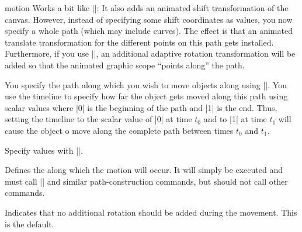\begin{sysanimateattribute}{motion}
    Works a bit like |\pgfsysanimvaltranslate|: It also adds an animated shift
    transformation of the canvas. However, instead of specifying some shift
    coordinates as values, you now specify a whole path (which may include
    curves). The effect is that an animated translate transformation for the
    different points on this path gets installed. Furthermore, if you use
    |\pgfsysanimkeyrotatealong|, an additional adaptive rotation transformation
    will be added so that the animated graphic scope ``points along'' the path.

    You specify the path along which you wish to move objects along using
    |\pgfsysanimkeymovealong|. You use the timeline to specify how far the
    object gets moved along this path using scalar values where |0| is the
    beginning of the path and |1| is the end. Thus, setting the timeline to the
    scalar value of |0| at time $t_0$ and to |1| at time $t_1$ will cause the
    object o move along the complete path between times $t_0$ and $t_1$.

    Specify values with |\pgfsysanimvalscalar|.

    \begin{command}{\pgfsysanimkeymovealong{}}
    \end{command}
    \begin{command}{\pgfsys@animation@movealong{}}
        Defines the  along which the motion will occur. It will
        simply be executed and must call |\pgfsys@lineto| and similar
        path-construction commands, but should not call other commands.
\begin{codeexample}[imagesource={standalone/pgfmanual-en-pgfsys-animations-animation-23.svg}]
\end{codeexample}
    \end{command}

    \begin{command}{\pgfsysanimkeynorotatealong}
    \end{command}
    \begin{command}{\pgfsys@animation@norotatealong}
        Indicates that no additional rotation should be added during the
        movement. This is the default.
    \end{command}


\end{sysanimateattribute}
